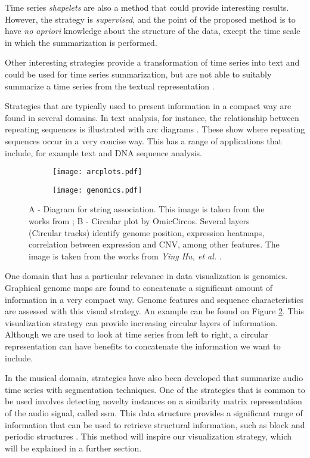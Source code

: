 Time series \textit{shapelets} are also a method that could provide interesting results. However, the strategy is \textit{supervised}, and the point of the proposed method is to have \textit{no apriori} knowledge about the structure of the data, except the time scale in which the summarization is performed. 
\par
Other interesting strategies provide a transformation of time series into text and could be used for time series summarization, but are not able to suitably summarize a time series from the textual representation \cite{ssts, sax}.

Strategies that are typically used to present information in a compact way are found in several domains. In text analysis, for instance, the relationship between repeating sequences is illustrated with arc diagrams \cite{bitmap, arcplots}. These show where repeating sequences occur in a very concise way. This has a range of applications that include, for example text and DNA sequence analysis.

\begin{figure}[b]
    \centering
    \begin{subfigure}{0.5\linewidth}
    \centering
        \texttt{[image: arcplots.pdf]}
        \caption{}
        \label{fig:genomic1}
    \end{subfigure}%
    \begin{subfigure}{0.5\linewidth}
        \centering
        \texttt{[image: genomics.pdf]}
        \caption{}
        \label{fig:genomic2}
    \end{subfigure}
    \caption{A - Diagram for string association. This image is taken from the works from \cite{arcplots}; B - Circular plot by OmicCircos. Several layers (Circular tracks) identify genome position, expression heatmaps, correlation between expression and CNV, among other features. The image is taken from the works from \textit{Ying Hu, et al.} \cite{genomics}.}
    \label{fig:summary_example}
\end{figure}

One domain that has a particular relevance in data visualization is genomics. Graphical genome maps are found to concatenate a significant amount of information in a very compact way. Genome features and sequence characteristics are assessed with this visual strategy. An example can be found on Figure \ref{fig:genomic2}. This visualization strategy can provide increasing circular layers of information. Although we are used to look at time series from left to right, a circular representation can have benefits to concatenate the information we want to include.
\par
In the musical domain, strategies have also been developed that summarize audio time series with segmentation techniques. One of the strategies that is common to be used involves detecting novelty instances on a similarity matrix representation of the audio signal, called \gls{ssm}. This data structure provides a significant range of information that can be used to retrieve structural information, such as block and periodic structures \cite{fmp1, fmp2, audiolabs1, audiolabs2}. This method will inspire our visualization strategy, which will be explained in a further section.

